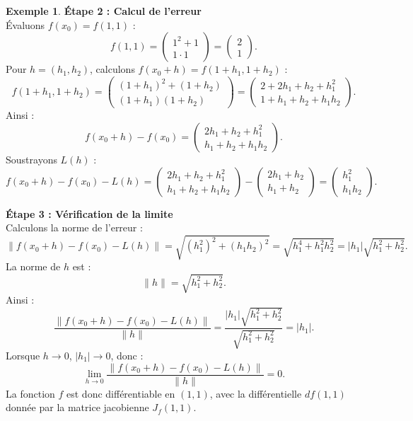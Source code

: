 \documentclass[a4paper,12pt,openany]{book}
\theoremstyle{plain}
\theoremstyle{definition}
\newtheorem{exemple}[theorem]{Exemple}
\theoremstyle{remark}
\theoremstyle{nbstyle}
\begin{document}
\begin{exemple}
		\textbf{Étape 2 : Calcul de l'erreur}\\
		Évaluons \( f(x_0) = f(1, 1) \) :
		\[
		f(1, 1) = \begin{pmatrix}
		1^2 + 1 \\
		1 \cdot 1
		\end{pmatrix} = \begin{pmatrix}
		2 \\
		1
		\end{pmatrix}.
		\]
		Pour \( h = (h_1, h_2) \), calculons \( f(x_0 + h) = f(1 + h_1, 1 + h_2) \) :
		\[
		f(1 + h_1, 1 + h_2) = \begin{pmatrix}
		(1 + h_1)^2 + (1 + h_2) \\
		(1 + h_1)(1 + h_2)
		\end{pmatrix} = \begin{pmatrix}
		2 + 2h_1 + h_2 + h_1^2 \\
		1 + h_1 + h_2 + h_1 h_2
		\end{pmatrix}.
		\]
		Ainsi :
		\[
		f(x_0 + h) - f(x_0) = \begin{pmatrix}
		2h_1 + h_2 + h_1^2 \\
		h_1 + h_2 + h_1 h_2
		\end{pmatrix}.
		\]
		Soustrayons \( L(h) \) :
		\[
		f(x_0 + h) - f(x_0) - L(h) = \begin{pmatrix}
		2h_1 + h_2 + h_1^2 \\
		h_1 + h_2 + h_1 h_2
		\end{pmatrix} - \begin{pmatrix}
		2h_1 + h_2 \\
		h_1 + h_2
		\end{pmatrix} = \begin{pmatrix}
		h_1^2 \\
		h_1 h_2
		\end{pmatrix}.
		\]
		
		\textbf{Étape 3 : Vérification de la limite}\\
		Calculons la norme de l'erreur :
		\[
		\lVert f(x_0 + h) - f(x_0) - L(h) \rVert = \sqrt{(h_1^2)^2 + (h_1 h_2)^2} = \sqrt{h_1^4 + h_1^2 h_2^2} = |h_1| \sqrt{h_1^2 + h_2^2}.
		\]
		La norme de \( h \) est :
		\[
		\lVert h \rVert = \sqrt{h_1^2 + h_2^2}.
		\]
		Ainsi :
		\[
		\frac{\lVert f(x_0 + h) - f(x_0) - L(h) \rVert}{\lVert h \rVert} = \frac{|h_1| \sqrt{h_1^2 + h_2^2}}{\sqrt{h_1^2 + h_2^2}} = |h_1|.
		\]
		Lorsque \( h \to 0 \), \( |h_1| \to 0 \), donc :
		\[
		\lim_{h \to 0} \frac{\lVert f(x_0 + h) - f(x_0) - L(h) \rVert}{\lVert h \rVert} = 0.
		\]
		La fonction \( f \) est donc différentiable en \( (1, 1) \), avec la différentielle \( df(1, 1) \) donnée par la matrice jacobienne \( J_f(1, 1) \).
	\end{exemple}
	
\end{document}
